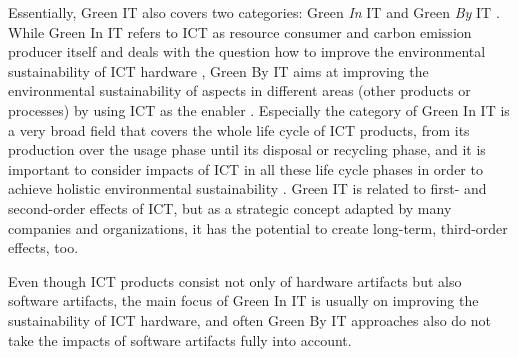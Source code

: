 \documentclass[oribibl]{llncs}
\begin{document}
 Essentially, Green IT also covers two categories: Green \textit{In} IT and Green \textit{By} IT \cite{hilty11}. While Green In IT refers to ICT as resource consumer and carbon emission producer itself and deals with the question how to improve the environmental sustainability of ICT hardware \cite{calero_green_2015}, Green By IT aims at improving the environmental sustainability of aspects in different areas (other products or processes) by using ICT as the enabler \cite{hilty11}. Especially the category of Green In IT is a very broad field that covers the whole life cycle of ICT products, from its production over the usage phase until its disposal or recycling phase, and it is important to consider impacts of ICT in all these life cycle phases in order to achieve holistic environmental sustainability \cite{hilty11}. %
Green IT is related to first- and second-order effects of ICT, but as a strategic concept adapted by many companies and organizations, it has the potential to create long-term, third-order effects, too. %

Even though ICT products consist not only of hardware artifacts but also software artifacts, the main focus of Green In IT is usually on improving the sustainability of ICT hardware, %
and often Green By IT approaches also do not take the impacts of software artifacts fully into account. %
\end{document}
